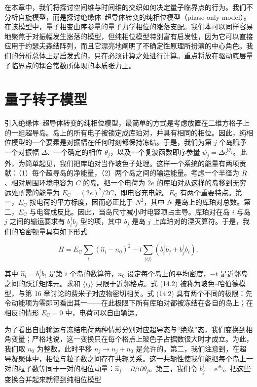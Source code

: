 在本章中，我们将探讨空间维与时间维的交织如何决定量子临界点的行为。我们不分析自旋模型，而是探讨绝缘体–超导体转变的纯相位模型（phase-only model）。在该模型中，量子相变由序参量的量子力学相位的涨落支配。我们本可以同样容易地聚焦于对振幅发生涨落的模型，但纯相位模型特别富有启发性，因为它可以直接应用于约瑟夫森结阵列，而且它漂亮地阐明了不确定性原理所扮演的中心角色。我们的分析总体上是启发式的，只在必须计算之处进行计算。重点将放在驱动底层量子临界点的耦合常数所体现的本质张力上。

\section{量子转子模型}

引入绝缘体–超导体转变的纯相位模型，最简单的方式是考虑放置在二维方格子上的一组超导岛。岛上的所有电子被锁定成库珀对，并具有相同的相位。因此，纯相位模型的一个要素是对振幅在任何时刻都保持冻结。于是，我们为第 $j$ 个岛赋予一个对振幅 $\Delta$、一个确定的相位 $\theta_j$，以及一个复波函数即序参量 $\psi_j=\Delta\mathrm{e}^{\mathrm{i}\theta_j}$。此外，为简单起见，我们把库珀对当作玻色子处理。这样一个系统的能量有两项贡献：（1）每个超导岛的净能量，（2）两个岛之间的输运能量。考虑一个半径为 $R$、相对周围环境电容为 $C$ 的岛。把一个电荷为 $2e$ 的库珀对从这样的岛移到无穷远处所需的能量为 $E_{\mathrm{C}}=(2e)^2/2C$，即电容充电能。$E_{\mathrm{C}}$ 有两个重要特点。第一，$E_{\mathrm{C}}$ 按电荷的平方标度，因而必正比于 $N^2$，其中 $N$ 是岛上的库珀对总数。第二，$E_{\mathrm{C}}$ 与电容成反比。因此，当岛尺寸减小时电容项占主导。库珀对在岛 $i$ 与岛 $j$ 之间的输运要求有 $b_i^\dagger b_j$ 型的项，其中 $b_j$ 是岛 $j$ 上库珀对的湮灭算符。于是，我们的哈密顿量具有如下形式

\begin{equation*}
H = E_{\mathrm{C}} \sum_i \left( \hat{n}_i - n_0 \right)^2 - t \sum_{\langle ij\rangle} \left( b_i^\dagger b_j + b_j^\dagger b_i \right),\tag{14.2}
\end{equation*}

其中 $\hat{n}_i=b_i^\dagger b_i$ 是第 $i$ 个岛的数算符，$n_0$ 设定每个岛上的平均密度，$-t$ 是近邻岛之间的跃迁矩阵元。求和 $\langle ij\rangle$ 只限于近邻格点。式 (14.2) 被称为玻色–哈伯德模型，与第 16 章讨论的费米子对应物密切相关。式 (14.2) 具有两个不同的极限：先令动能项为零即可看出其一——在此极限下所有库珀对都被冻结在各自的岛上；在相反的情形 $E_{\mathrm{C}}=0$ 中，电荷可以自由输运。

为了看出自由输运与冻结电荷两种情形分别对应超导态与“绝缘”态，我们变换到相角变量；严格地说，这一变换只在每个格点上玻色子占据数很大时才成立。为此，我们取 $n_0$ 为整数。此时平移 $n_j\rightarrow n_j+n_0$ 是允许的。第二，我们注意到，在超导凝聚体中，相位与粒子数之间存在共轭关系。这一共轭性使我们能把每个岛上一对的粒子数等同于一对的相位动量：$\hat{n}_j=\partial/\mathrm{i}\partial\theta_j$。第三，我们令 $b_j^\dagger=\mathrm{e}^{\mathrm{i}\theta_j}$。把这些变换合并起来就得到纯相位模型

